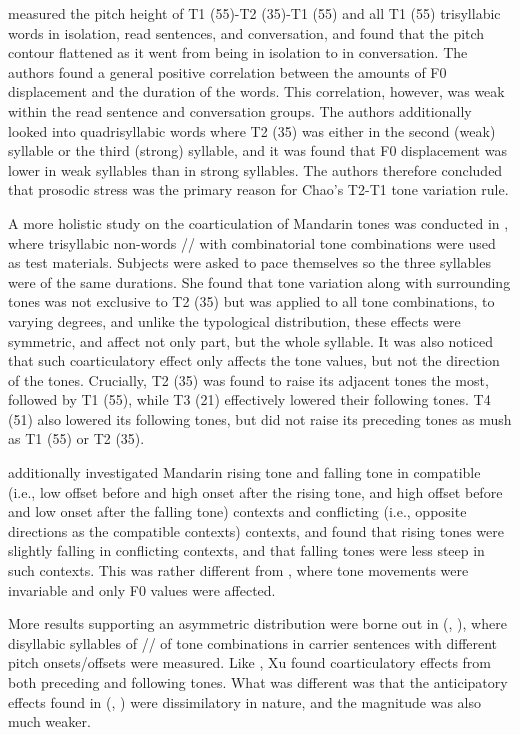 \documentclass[12pt]{report}
\newcommand{\tip}{\textipa}
\begin{document}
\begin{CJK}{UTF8}{bsmi}
\cite{ShihSproat1992} measured the pitch height of T1 (55)-T2 (35)-T1 (55) and all T1 (55) trisyllabic words in isolation, read sentences, and conversation, and found that the pitch contour flattened as it went from being in isolation to in conversation. The authors found a general positive correlation between the amounts of F0 displacement and the duration of the words. This correlation, however, was weak within the read sentence and conversation groups. The authors additionally looked into quadrisyllabic words where T2 (35) was either in the second (weak) syllable or the third (strong) syllable, and it was found that F0 displacement was lower in weak syllables than in strong syllables. The authors therefore concluded that prosodic stress was the primary reason for Chao's T2-T1 tone variation rule.

A more holistic study on the coarticulation of Mandarin tones was conducted in \cite{Shen1990}, where trisyllabic non-words /\tip{pa.pa.pa}/ with combinatorial tone combinations were used as test materials. Subjects were asked to pace themselves so the three syllables were of the same durations.  She found that tone variation along with surrounding tones was not exclusive to T2 (35) but was applied to all tone combinations, to varying degrees, and unlike the typological distribution, these effects were symmetric, and affect not only part, but the whole syllable. It was also noticed that such coarticulatory effect only affects the tone values, but not the direction of the tones. Crucially, T2 (35) was found to raise its adjacent tones the most, followed by T1 (55), while T3 (21) effectively lowered their following tones. T4 (51) also lowered its following tones, but did not raise its preceding tones as mush as T1 (55) or T2 (35).

\cite{Xu1994} additionally investigated Mandarin rising tone and falling tone in compatible (i.e., low offset before and high onset after the rising tone, and high offset before and low onset after the falling tone) contexts and conflicting (i.e., opposite directions as the compatible contexts) contexts, and found that rising tones were slightly falling in conflicting contexts, and that falling tones were less steep in such contexts. This was rather different from \cite{Shen1990}, where tone movements were invariable and only F0 values were affected.

More results supporting an asymmetric distribution were borne out in \citeauthor{Xu1994a} (\citeyear{Xu1994a}, \citeyear{Xu1997}), where disyllabic syllables of /\tip{ma.ma}/ of tone combinations in carrier sentences with different pitch onsets/offsets were measured. Like \cite{Shen1990}, Xu found coarticulatory effects from both preceding and following tones. What was different was that the anticipatory effects found in \citeauthor{Xu1994a} (\citeyear{Xu1994a}, \citeyear{Xu1997}) were dissimilatory in nature, and the magnitude was also much weaker.


\end{CJK}
\end{document}
